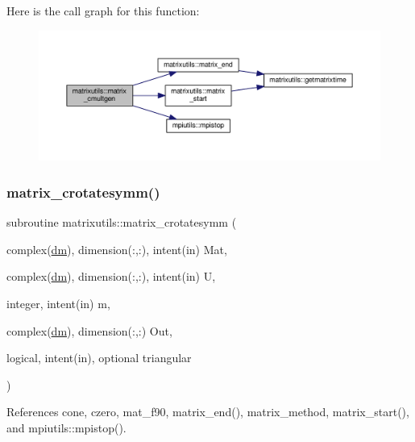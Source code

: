 Here is the call graph for this function\+:
\nopagebreak
\begin{figure}[H]
\begin{center}
\leavevmode
\includegraphics[width=350pt]{namespacematrixutils_af451dede0e0f43908b5f8fdbd6b64717_cgraph}
\end{center}
\end{figure}
\mbox{\label{namespacematrixutils_a289ea264af6294e91e4906d329ab1bca}} 
\subsubsection{\texorpdfstring{matrix\+\_\+crotatesymm()}{matrix\_crotatesymm()}}
{\footnotesize\ttfamily subroutine matrixutils\+::matrix\+\_\+crotatesymm (\begin{DoxyParamCaption}\item[{complex(\mbox{\hyperlink{namespacematrixutils_a7bdc564986ea4d90f51201c75606ef3d}{dm}}), dimension(\+:,\+:), intent(in)}]{Mat,  }\item[{complex(\mbox{\hyperlink{namespacematrixutils_a7bdc564986ea4d90f51201c75606ef3d}{dm}}), dimension(\+:,\+:), intent(in)}]{U,  }\item[{integer, intent(in)}]{m,  }\item[{complex(\mbox{\hyperlink{namespacematrixutils_a7bdc564986ea4d90f51201c75606ef3d}{dm}}), dimension(\+:,\+:)}]{Out,  }\item[{logical, intent(in), optional}]{triangular }\end{DoxyParamCaption})}



References cone, czero, mat\+\_\+f90, matrix\+\_\+end(), matrix\+\_\+method, matrix\+\_\+start(), and mpiutils\+::mpistop().

